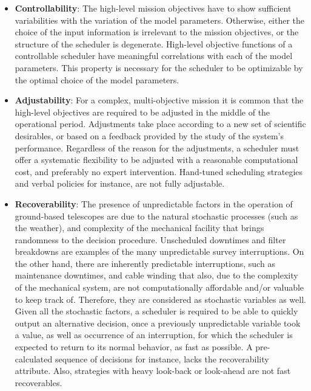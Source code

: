 \documentclass[12pt,aas_macros]{article}
\theoremstyle{definition}
\begin{document}
\begin{itemize}
\item \textbf{Controllability}: The high-level mission objectives have to show sufficient variabilities with the variation of the model parameters. Otherwise, either the choice of the input  information is irrelevant to the mission objectives, or the structure of the scheduler is degenerate. High-level objective functions of a controllable scheduler have meaningful correlations with each of the model parameters. This property is necessary for the scheduler to be optimizable by the optimal choice of the model parameters.

\item \textbf{Adjustability}: For a complex, multi-objective mission it is common that the high-level objectives are required to be adjusted in the middle of the operational period. Adjustments take place according to a new set of scientific desirables, or based on a feedback provided by the study of the system's performance. Regardless of the reason for the adjustments, a scheduler must offer a systematic flexibility to be adjusted with a reasonable computational cost, and preferably no expert intervention. Hand-tuned scheduling strategies and verbal policies for instance, are not fully adjustable.

\item \textbf{Recoverability}: The presence of unpredictable factors in the operation of ground-based telescopes are due to the natural stochastic processes (such as the weather), and complexity of the mechanical facility that brings randomness to the decision procedure. Unscheduled downtimes and filter breakdowns are examples of the many unpredictable survey interruptions. On the other hand, there are inherently predictable interruptions, such as maintenance downtimes, and cable winding that also, due to the complexity of the mechanical system, are not computationally affordable and/or valuable to keep track of. Therefore, they are considered as stochastic variables as well. Given all the stochastic factors, a scheduler is required to be able to quickly output an alternative decision, once a previously unpredictable variable took a value, as well as occurrence of an interruption, for which the scheduler is expected to return to its normal behavior, as fast as possible. A pre-calculated sequence of decisions for instance, lacks the recoverability attribute. Also, strategies with heavy look-back or look-ahead are not fast recoverables. 
\end{itemize}
\end{document}
